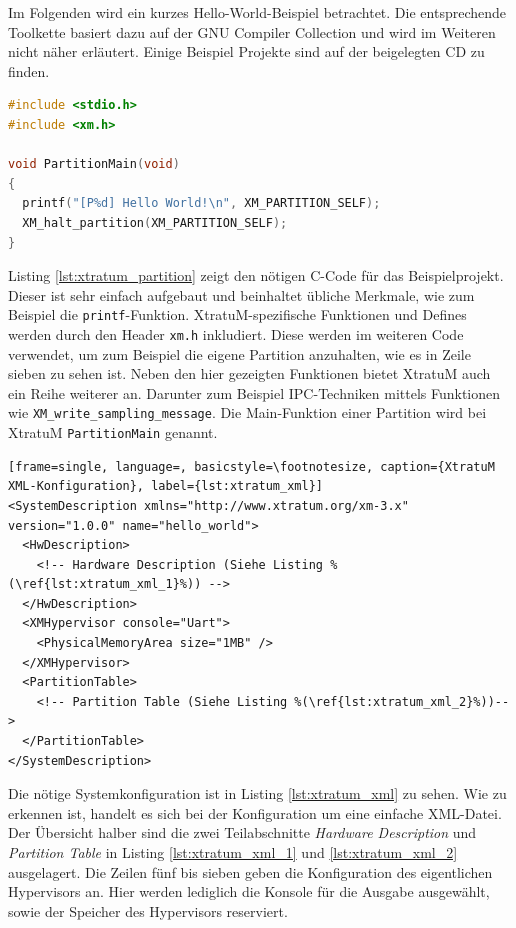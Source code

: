 \documentclass[
  a4paper,					    %
  twoside,
  DIV=calc,     				%
  bibliography=totoc,
  cleardoublepage=empty,
  ngerman,     					%
  final       					%
]{scrbook}
\begin{document}
Im Folgenden wird ein kurzes Hello-World-Beispiel betrachtet. Die entsprechende Toolkette basiert dazu auf der GNU Compiler Collection und wird im Weiteren nicht näher erläutert. Einige Beispiel Projekte sind auf der beigelegten CD zu finden.

\begin{lstlisting}[frame=single, language=C, basicstyle=\footnotesize, caption={XtratuM Beispiel Partition}, label={lst:xtratum_partition}]
#include <stdio.h>
#include <xm.h>

void PartitionMain(void)
{
  printf("[P%d] Hello World!\n", XM_PARTITION_SELF);
  XM_halt_partition(XM_PARTITION_SELF);
}
\end{lstlisting}

Listing \ref{lst:xtratum_partition} zeigt den nötigen C-Code für das Beispielprojekt. Dieser ist sehr einfach aufgebaut und beinhaltet übliche Merkmale, wie zum Beispiel die \texttt{printf}-Funktion. XtratuM-spezifische Funktionen und Defines werden durch den Header \texttt{xm.h} inkludiert. Diese werden im weiteren Code verwendet, um zum Beispiel die eigene Partition anzuhalten, wie es in Zeile sieben zu sehen ist. Neben den hier gezeigten Funktionen bietet XtratuM auch ein Reihe weiterer an. Darunter zum Beispiel IPC-Techniken mittels Funktionen wie \texttt{XM\_write\_sampling\_message}. Die Main-Funktion einer Partition wird bei XtratuM \texttt{PartitionMain} genannt.

\begin{lstlisting}[frame=single, language=, basicstyle=\footnotesize, caption={XtratuM XML-Konfiguration}, label={lst:xtratum_xml}]
<SystemDescription xmlns="http://www.xtratum.org/xm-3.x" version="1.0.0" name="hello_world">
  <HwDescription>
    <!-- Hardware Description (Siehe Listing %(\ref{lst:xtratum_xml_1}%)) -->
  </HwDescription>
  <XMHypervisor console="Uart">
    <PhysicalMemoryArea size="1MB" />
  </XMHypervisor>
  <PartitionTable>
    <!-- Partition Table (Siehe Listing %(\ref{lst:xtratum_xml_2}%))-->
  </PartitionTable>
</SystemDescription>
\end{lstlisting}

Die nötige Systemkonfiguration ist in Listing \ref{lst:xtratum_xml} zu sehen. Wie zu erkennen ist, handelt es sich bei der Konfiguration um eine einfache XML-Datei. Der Übersicht halber sind die zwei Teilabschnitte \emph{Hardware Description} und \emph{Partition Table} in Listing \ref{lst:xtratum_xml_1} und \ref{lst:xtratum_xml_2} ausgelagert. Die Zeilen fünf bis sieben geben die Konfiguration des eigentlichen Hypervisors an. Hier werden lediglich die Konsole für die Ausgabe ausgewählt, sowie der Speicher des Hypervisors reserviert.
\end{document}
